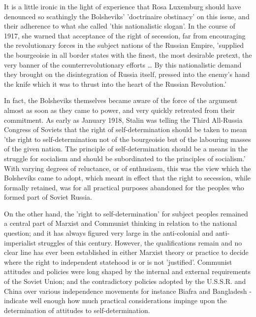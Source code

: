 It is a little ironic in the light of experience that Rosa Luxemburg should have denounced so scathingly the Bolsheviks' 'doctrinaire obstinacy' on this issue, and their adherence to what she called 'this nationalistic slogan'. In the course of 1917, she warned that acceptance of the right of secession, far from encouraging the revolutionary forces in the subject nations of the Russian Empire, 'supplied the bourgeoisie in all border states with the finest, the most desirable pretext, the very banner of the counterrevolutionary efforts \dots{} By this nationalistic demand they brought on the disintegration of Russia itself, pressed into the enemy's hand the knife which it was to thrust into the heart of the Russian Revolution.'

In fact, the Bolsheviks themselves became aware of the force of the argument almost as soon as they came to power, and very quickly retreated from their commitment. As early as January 1918, Stalin was telling the Third All-Russia Congress of Soviets that the right of self-determination should be taken to mean 'the right to self-determination not of the bourgeoisie but of the labouring masses of the given nation. The principle of self\hyp{}determination should be a means in the struggle for socialism and should be subordinated to the principles of socialism.' With varying degrees of reluctance, or of enthusiasm, this was the view which the Bolsheviks came to adopt, which meant in effect that the right to secession, while formally retained, was for all practical purposes abandoned for the peoples who formed part of Soviet Russia.

On the other hand, the 'right to self-determination' for subject peoples remained a central part of Marxist and Communist thinking in relation to the national question; and it has always figured very large in the anti-colonial and anti-imperialist struggles of this century. However, the qualifications remain and no clear line has ever been established in either Marxist theory or practice to decide where the right to independent statehood is or is not 'justified'. Communist attitudes and policies were long shaped by the internal and external requirements of the Soviet Union; and the contradictory policies adopted by the U.S.S.R. and China over various independence movements for instance Biafra and Bangladesh - indicate well enough how much practical considerations impinge upon the determination of attitudes to self-determination.

